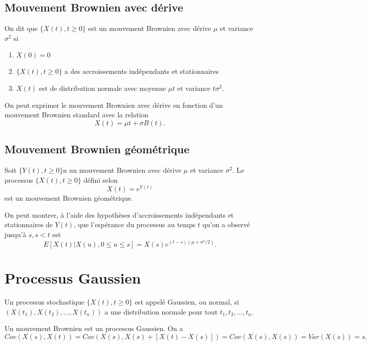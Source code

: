 \subsection{Mouvement Brownien avec dérive}

\begin{definition}{}{}
	On dit que $\{X(t), t\geq 0\}$ est un mouvement Brownien avec dérive $\mu$ et variance $\sigma^2$ si 
	\begin{enumerate}
		\item $X(0) = 0$
		\item $\{X(t), t \geq 0\}$ a des accroissements indépendants et stationnaires
		\item $X(t)$ est de distribution normale avec moyenne $\mu t$ et variance $t \sigma^2$. 
	\end{enumerate}
	On peut exprimer le mouvement Brownien avec dérive en fonction d'un mouvement Brownien standard avec la relation 
	$$X(t) = \mu t + \sigma B(t).$$
\end{definition}

\subsection{Mouvement Brownien géométrique}

\begin{definition}{}{}
	Soit $\{Y(t), t\geq 0\}$n un mouvement Brownien avec dérive $\mu$ et variance $\sigma^2$. Le processus $\{X(t), t \geq 0\}$ défini selon $$X(t) = e^{Y(t)}$$
	est un mouvement Brownien géométrique. 
\end{definition}
On peut montrer, à l'aide des hypothèses d'accroissements indépendants et stationnaires de $Y(t)$, que l'espérance du processus au temps $t$ qu'on a observé jusqu'à $s, s<t$ est 
$$E[X(t) \vert X(u), 0\leq u \leq s] = X(s) e^{(t-s)(\mu + \sigma^2/2)}.$$

\section{Processus Gaussien}

\begin{definition}{}{}
	Un processus stochastique $\{X(t), t\geq 0\}$ est appelé Gaussien, ou normal, si $\left(X(t_1), X(t_2), \dots, X(t_n)\right)$ a une distribution normale pour tout $t_1, t_2, \dots, t_n$.
\end{definition}

Un mouvement Brownien est un processus Gaussien. On a 
$$Cov(X(s), X(t)) =Cov(X(s), X(s) + [X(t) - X(s)]) = Cov(X(s), X(s)) = Var(X(s)) = s.$$

